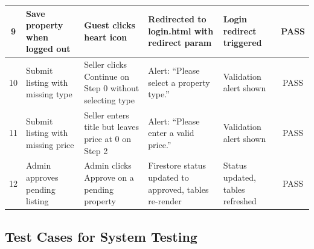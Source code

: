 \documentclass[12pt,a4paper]{report}
\begin{document}
\begin{table}[H]
\begin{tabularx}{\textwidth}{|c|X|X|X|X|c|}
\hline
9 & Save property when logged out &
  Guest clicks heart icon &
  Redirected to login.html with redirect param &
  Login redirect triggered & PASS \\
\hline
10 & Submit listing with missing type &
  Seller clicks Continue on Step 0 without selecting type &
  Alert: ``Please select a property type.'' &
  Validation alert shown & PASS \\
\hline
11 & Submit listing with missing price &
  Seller enters title but leaves price at 0 on Step 2 &
  Alert: ``Please enter a valid price.'' &
  Validation alert shown & PASS \\
\hline
12 & Admin approves pending listing &
  Admin clicks Approve on a pending property &
  Firestore status updated to approved, tables re-render &
  Status updated, tables refreshed & PASS \\
\hline
\end{tabularx}
\end{table}

\subsection{Test Cases for System Testing}
\end{document}
